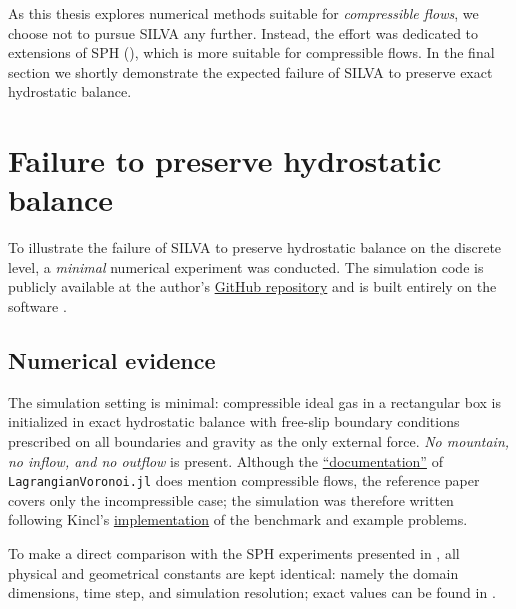 \documentclass[../main.tex]{subfiles}
\begin{document}
As this thesis explores numerical methods suitable for \emph{compressible flows}, we choose not to pursue SILVA any further. Instead, the effort was dedicated to extensions of SPH (), which is more suitable for compressible flows. In the final section  we shortly demonstrate the expected failure of SILVA to preserve exact hydrostatic balance.

\section{Failure to preserve hydrostatic balance}
\label{sec:SILVA_FAILURE}

To illustrate the failure of SILVA to preserve hydrostatic balance on the discrete level, a \emph{minimal} numerical experiment was conducted. The simulation code is publicly available at the author's \href{https://github.com/kamilbelan/silva-mountain-waves}{GitHub repository} and is built entirely on the software \autocite{Kincl_LagrangianVoronoi_jl,kinclSemiimplicitLagrangianVoronoi2025}.

\subsection{Numerical evidence}
\label{sec:NUMERICAL_EVIDENCE}

The simulation setting is minimal: compressible ideal gas in a rectangular box is initialized in exact hydrostatic balance  with free-slip boundary conditions prescribed on all boundaries and gravity as the only external force. \emph{No mountain, no inflow, and no outflow} is present.
Although the \href{https://github.com/OndrejKincl/LagrangianVoronoi.jl/blob/master/README.md}{\enquote{documentation}} of \texttt{LagrangianVoronoi.jl} does mention compressible flows, the reference paper \autocite{kinclSemiimplicitLagrangianVoronoi2025} covers only the incompressible case; the simulation was therefore written following Kincl's \href{https://github.com/OndrejKincl/LagrangianVoronoi.jl/tree/master/examples}{implementation} of the benchmark and example problems.

To make a direct comparison with the SPH experiments presented in , all physical and geometrical constants are kept identical: namely the domain dimensions, time step, and simulation resolution; exact values can be found in .
\end{document}
